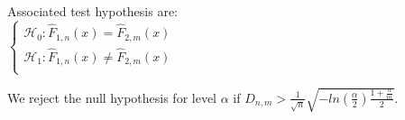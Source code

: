 Associated test hypothesis are: \\

$
\left\{
    \begin{array}{ll}
        \mathcal{H}_0: \widehat{F}_{1,n}(x) = \widehat{F}_{2,m}(x) \\
        \mathcal{H}_1: \widehat{F}_{1,n}(x) \neq \widehat{F}_{2,m}(x) \\
    \end{array}
\right.
$

We reject the null hypothesis for level $\alpha$ if $D_{n,m} > \frac{1}{\sqrt{n}} \sqrt{-ln(\frac{\alpha}{2}) \frac{1 + \frac{n}{m}}{2}}$.

\vspace{5mm}